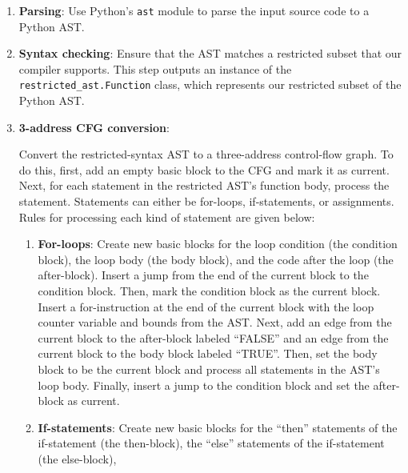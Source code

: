 \documentclass[sigconf, screen, natbib=false, dvipsnames, table]{acmart}
\theoremstyle{definition}
\begin{document}
\begin{enumerate}
  \item
        \textbf{Parsing}:
        Use Python's \texttt{ast} module to parse the input source code to a Python AST.
  \item
        \textbf{Syntax checking}:
        Ensure that the AST matches a restricted subset that our compiler supports.
        This step outputs an instance of the \texttt{restricted\_ast.Function} class, which represents our restricted subset of the Python AST.
  \item
        \textbf{3-address CFG conversion}:

        Convert the restricted-syntax AST to a three-address control-flow graph.
        To do this, first,
        add an empty basic block to the CFG and mark it as current.
        Next, for each statement in the restricted AST's function body,
        process the statement.
        Statements can either be for-loops, if-statements, or assignments.
        Rules for processing each kind of statement are given below:
        \begin{enumerate}
          \item
                \textbf{For-loops}:
                Create new basic blocks for
                the loop condition
                (the condition block),
                the loop body
                (the body block),
                and the code after the loop
                (the after-block).
                Insert a jump from the end of the current block to the condition block.
                Then, mark the condition block as the current block.
                Insert a for-instruction at the end of the current block with the loop counter variable and bounds from the AST.
                Next, add an edge from the current block to the after-block labeled ``FALSE'' and
                an edge from the current block to the
                body block labeled ``TRUE''.
                Then, set the body block to be the current block
                and process all statements in the AST's loop body.
                Finally, insert a jump to the condition block and set the after-block as current.
          \item
                \textbf{If-statements}:
                Create new basic blocks for
                the ``then'' statements of the if-statement
                (the then-block),
                the ``else'' statements of the if-statement
                (the else-block),

\end{enumerate}
\end{enumerate}
\end{document}
